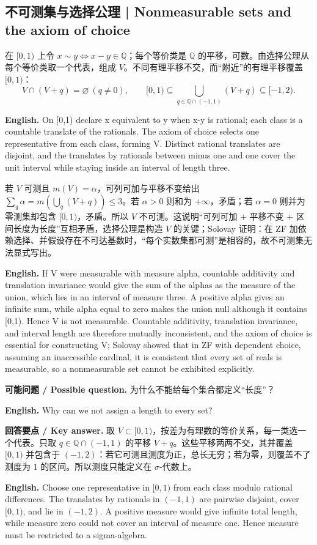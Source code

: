 \documentclass[UTF8,11pt,a4paper]{ctexart}
\newcommand{\EN}[1]{\par\noindent\textbf{English.} #1\par}
\let\APSsubsection\subsection
\renewcommand{\subsection}[1]{\Needspace{6\baselineskip}\APSsubsection{#1}}
\newcommand{\ASK}[4]{\par\noindent\textbf{可能问题 / Possible question.} #1\par\EN{#2}\noindent\textbf{回答要点 / Key answer.} #3\par\EN{#4}\medskip}
\begin{document}
\subsection{不可测集与选择公理 | Nonmeasurable sets and the axiom of choice}
\noindent 在 $[0,1)$ 上令 $x\sim y\iff x-y\in\mathbb Q$；每个等价类是 $\mathbb Q$ 的平移，可数。由选择公理从每个等价类取一个代表，组成 $V$。不同有理平移不交，而“附近”的有理平移覆盖 $[0,1)$：
\[
V\cap(V+q)=\varnothing\ (q\ne0),
\qquad
[0,1)\subseteq\bigcup_{q\in\mathbb Q\cap(-1,1)}(V+q)\subseteq[-1,2).
\]
\EN{On [0,1) declare x equivalent to y when x-y is rational; each class is a countable translate of the rationals. The axiom of choice selects one representative from each class, forming V. Distinct rational translates are disjoint, and the translates by rationals between minus one and one cover the unit interval while staying inside an interval of length three.}
\noindent 若 $V$ 可测且 $m(V)=\alpha$，可列可加与平移不变给出 $\sum_{q}\alpha=m(\bigcup_q(V+q))\le3$。若 $\alpha>0$ 则和为 $+\infty$，矛盾；若 $\alpha=0$ 则并为零测集却包含 $[0,1)$，矛盾。所以 $V$ 不可测。这说明“可列可加 + 平移不变 + 区间长度为长度”互相矛盾，选择公理是构造 $V$ 的关键；Solovay 证明：在 ZF 加依赖选择、并假设存在不可达基数时，“每个实数集都可测”是相容的，故不可测集无法显式写出。
\EN{If V were measurable with measure alpha, countable additivity and translation invariance would give the sum of the alphas as the measure of the union, which lies in an interval of measure three. A positive alpha gives an infinite sum, while alpha equal to zero makes the union null although it contains [0,1). Hence V is not measurable. Countable additivity, translation invariance, and interval length are therefore mutually inconsistent, and the axiom of choice is essential for constructing V; Solovay showed that in ZF with dependent choice, assuming an inaccessible cardinal, it is consistent that every set of reals is measurable, so a nonmeasurable set cannot be exhibited explicitly.}
\ASK{为什么不能给每个集合都定义“长度”？}{Why can we not assign a length to every set?}{取 $V\subset[0,1)$，按差为有理数的等价关系，每一类选一个代表。只取 $q\in\mathbb Q\cap(-1,1)$ 的平移 $V+q$。这些平移两两不交，其并覆盖 $[0,1)$ 并包含于 $(-1,2)$：若它可测且测度为正，总长无穷；若为零，则覆盖不了测度为 $1$ 的区间。所以测度只能定义在 $\sigma$-代数上。}{Choose one representative in $[0,1)$ from each class modulo rational differences. The translates by rationals in $(-1,1)$ are pairwise disjoint, cover $[0,1)$, and lie in $(-1,2)$. A positive measure would give infinite total length, while measure zero could not cover an interval of measure one. Hence measure must be restricted to a sigma-algebra.}
\end{document}
